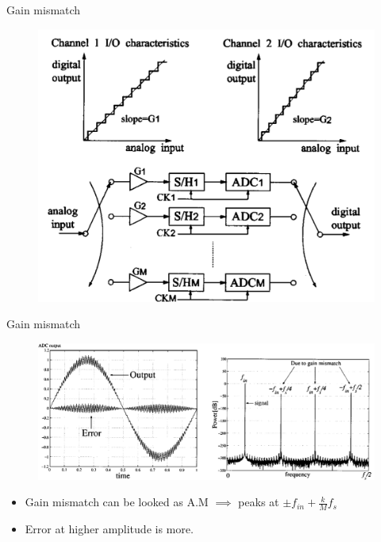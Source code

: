 \documentclass{beamer}
\begin{document}
\begin{frame}{Gain mismatch}
\begin{figure}
	\includegraphics[scale=0.2]{./figs/Gain.png}
\end{figure}
\end{frame}

\begin{frame}{Gain mismatch}
\begin{figure}
	\includegraphics[scale=0.3]{./figs/Gainplot.png}
\end{figure}
\pause
\begin{itemize}
\item Gain mismatch can be looked as A.M $\implies$ peaks at $\pm f_{in} + \frac{k}{M}f_{s}$
\item Error at higher amplitude is more.
\end{itemize}
\end{frame}
\end{document}

